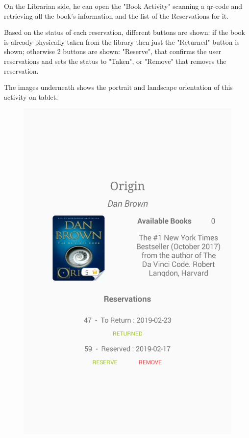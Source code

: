 \newpage
{}
On the Librarian side, he can open the "Book Activity" scanning a qr-code and retrieving all the book's information and the list of the Reservations for it.\par
Based on the status of each reservation, different buttons are shown: if the book is already physically taken from the library then just the "Returned" button is shown; otherwise 2 buttons are shown: "Reserve", that confirms the user reservations and sets the status to "Taken", or "Remove" that removes the reservation.\par
The images underneath shows the portrait and landscape orientation of this activity on tablet.
\vspace*{1cm}
\begin{figure}[H]
	\centering
	\includegraphics[scale=0.2]{Images/UI/Librarian/1}

\end{figure}
